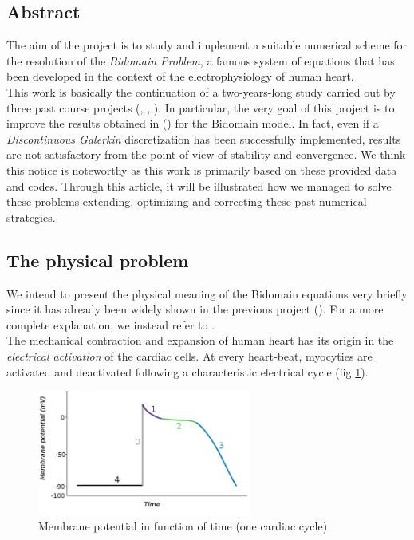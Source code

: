 \documentclass[a4paper,12pt]{article}
\begin{document}
    \subsection{Abstract}
    The aim of the project is to study and implement a suitable numerical scheme for the resolution of the \emph{Bidomain Problem}, a famous system of equations that has been developed in the context of the electrophysiology of human heart. \\
    This work is basically the continuation of a two-years-long study carried out by three past course projects (\cite{bagnara}, \cite{andreotti}, \cite{marta}). In particular, the very goal of this project is to improve the results obtained in \parencite{marta} (\citeauthor{marta}) for the Bidomain model. In fact, even if a \emph{Discontinuous Galerkin} discretization has been successfully implemented, results are not satisfactory from the point of view of stability and convergence. We think this notice is noteworthy as this work is primarily based on these provided data and codes. Through this article, it will be illustrated how we managed to solve these problems extending, optimizing and correcting these past numerical strategies.
    
    \subsection{The physical problem}
    We intend to present the physical meaning of the Bidomain equations very briefly since it has already been widely shown in the previous project (\citeauthor{marta}). For a more complete explanation, we instead refer to \cite{acta}.\\
    The mechanical contraction and expansion of human heart has its origin in the \emph{electrical activation} of the cardiac cells. At every heart-beat, myocyties are activated and deactivated following a characteristic electrical cycle (fig \ref{potential_cycle}). 
    
    
    \begin{figure}[h]
    \begin{center}
    \includegraphics[width = 7cm]{./potential_cycle.png}
    \caption{Membrane potential in function of time (one cardiac cycle)}
    \label{potential_cycle}
    \end{center}
    \end{figure}
    
\end{document}
